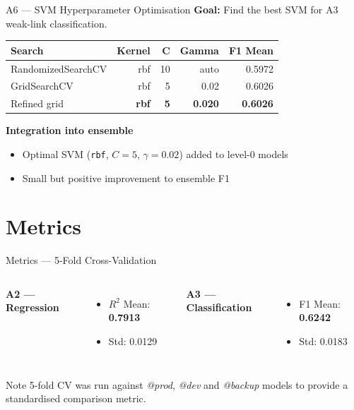 \documentclass{beamer}
\begin{document}
\begin{frame}{A6 --- SVM Hyperparameter Optimisation}
    \textbf{Goal:} Find the best SVM for A3 weak-link classification.
    \vspace{0.3em}
    \begin{table}
        \small
        \begin{tabular}{l r r r r}
            \toprule
            \textbf{Search} & \textbf{Kernel} & \textbf{C} & \textbf{Gamma} & \textbf{F1 Mean} \\
            \midrule
            RandomizedSearchCV & rbf  & 10  & auto  & 0.5972 \\
            GridSearchCV       & rbf  & 5   & 0.02  & 0.6026 \\
            Refined grid       & \textbf{rbf} & \textbf{5} & \textbf{0.020} & \textbf{0.6026} \\
            \bottomrule
        \end{tabular}
    \end{table}
    \vspace{0.3em}
    \textbf{Integration into ensemble}
    \begin{itemize}
        \item Optimal SVM (\texttt{rbf}, $C=5$, $\gamma=0.02$) added to level-0 models
        \item Small but positive improvement to ensemble F1
    \end{itemize}
    \vspace{0.3em}
\end{frame}

\section{Metrics}

\begin{frame}{Metrics --- 5-Fold Cross-Validation}
    \begin{columns}
        \textbf{A2 --- Regression}
        \begin{itemize}
            \item $R^2$ Mean: \textbf{0.7913}
            \item Std: 0.0129
        \end{itemize}

        \textbf{A3 --- Classification}
        \begin{itemize}
            \item F1 Mean: \textbf{0.6242}
            \item Std: 0.0183
        \end{itemize}
    \end{columns}
    \vspace{0.5em}
    \begin{block}{Note}
        5-fold CV was run against \textit{@prod}, \textit{@dev} and \textit{@backup}
        models to provide a standardised comparison metric.
    \end{block}
\end{frame}
\end{document}
